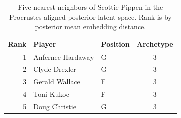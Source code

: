 \begin{table}[htbp]
  \centering\small
  \begin{tabular}{rllc}
    \toprule
    Rank & Player & Position & Archetype \\
    \midrule
    1 & Anfernee Hardaway & G & 3 \\
    2 & Clyde Drexler & G & 3 \\
    3 & Gerald Wallace & F & 3 \\
    4 & Toni Kukoc & F & 3 \\
    5 & Doug Christie & G & 3 \\
    \bottomrule
  \end{tabular}
  \caption{Five nearest neighbors of Scottie Pippen in the Procrustes-aligned posterior latent space. Rank is by posterior mean embedding distance.}
  \label{tab:Scottie_Pippen_neighbors}
\end{table}

